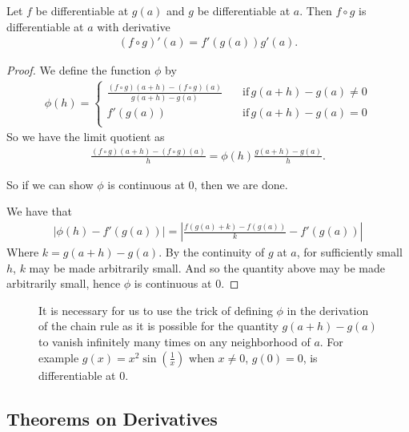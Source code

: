 \documentclass[]{article}
\begin{document}
\begin{thm} 
		Let $f$ be differentiable at $g(a)$ and $g$ be differentiable at $a$. Then $f \circ g$ is differentiable at $a$ with derivative
		\begin{align*}
				(f \circ g)'(a) = f'(g(a))g'(a).
		\end{align*}
\end{thm}

\begin{proof}
		We define the function $\phi$ by 
		\begin{align*}
				\phi(h) = \begin{cases}
						\frac{(f\circ g)(a+h) - (f\circ g)(a)}{g(a+h)-g(a)} \quad &\text{if} \, g(a+h) -g(a) \neq 0 \\
						f'(g(a)) \quad &\text{if} \, g(a+h) - g(a) = 0 \\
				\end{cases}
		\end{align*}
		So we have the limit quotient as 
		\begin{align*}
				\frac{(f \circ g)(a+h) - (f \circ g)(a)}{h} = \phi(h) \frac{g(a+h)-g(a)}{h}.
		\end{align*}

		So if we can show $\phi$ is continuous at $0$, then we are done.

		We have that 
		\begin{align*}
				|\phi(h) - f'(g(a))| = |\frac{f(g(a) + k) - f(g(a))}{k} - f'(g(a))|
		\end{align*}
		Where $k = g(a+h) - g(a)$. By the continuity of $g$ at $a$, for sufficiently small $h$, $k$ may be made arbitrarily small. And so the quantity above may be made arbitrarily small, hence $\phi$ is continuous at $0$.
\end{proof}

\begin{figure}[ht]
\centering
{}
\caption{It is necessary for us to use the trick of defining $\phi$ in the derivation of the chain rule as it is possible for the quantity $g(a+h) - g(a)$ to vanish infinitely many times on any neighborhood of $a$. For example $g(x) = x^2 \sin(\frac{1}{x})$ when $x \neq 0$, $g(0) = 0$, is differentiable at $0$.}
\label{fig:x-squared-sin-reciprocal}
\end{figure}

\subsection{Theorems on Derivatives}
\end{document}
